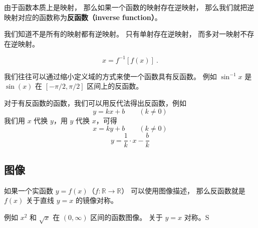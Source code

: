 
\begin{issues}
\issueDraft
\end{issues}

由于函数本质上是映射， 那么如果一个函数的映射存在逆映射， 那么我们就把逆映射对应的函数称为\textbf{反函数（inverse function）}。

我们知道不是所有的映射都有逆映射。 只有单射存在逆映射， 而多对一映射不存在逆映射。

\begin{equation}
x = f^{-1}[f(x)]~.
\end{equation}

我们往往可以通过缩小定义域的方式来使一个函数具有反函数。 例如 $\sin^{-1} x$ 是 $\sin(x)$ 在 $[-\pi/2, \pi/2]$ 区间上的反函数。

对于有反函数的函数，我们可以用反代法得出反函数，例如
\begin{equation}
y = kx + b \qquad (k \ne 0)
\end{equation}
我们用 $x$ 代换 $y$，用 $y$ 代换 $x$，可得
\begin{equation}
x = ky + b \qquad (k \ne 0)
\end{equation}
\begin{equation}
y = \frac{1}{k} \cdot x - \frac{b}{k}
\end{equation}

\subsection{图像}
如果一个实函数 $y = f(x)$（$f: \mathbb R \to \mathbb R$） 可以使用图像描述， 那么反函数就是 $f(x)$ 关于直线 $y = x$ 的镜像对称。

例如 $x^2$ 和 $\sqrt{x}$ 在 $(0, \infty)$ 区间的函数图像。 关于 $y = x$ 对称。S